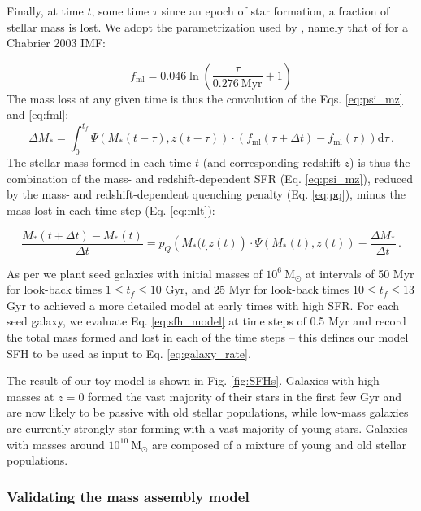 \documentclass[fleqn,usenatbib]{mnras}
\begin{document}
Finally, at time $t$, some time $\tau$ since an epoch of star formation, a fraction of stellar mass is lost. We adopt the parametrization used by , namely that of \citet{Leitner2011} for a Chabrier 2003 IMF:

\begin{equation}
    f_{\mathrm{ml}} = 0.046\ln \left(\frac{\tau}{0.276~\mathrm{Myr}}+1 \right)
    \label{eq:fml}
\end{equation}
The mass loss at any given time is thus the convolution of the Eqs. \ref{eq:psi_mz} and \ref{eq:fml}:
\begin{equation}
    \Delta M_* = \int_0^{t_f} \Psi(M_*(t-\tau),z(t-\tau))\cdot\left(f_{\mathrm{ml}}(\tau + \Delta t) - f_{\mathrm{ml}}(\tau)\right)\mathrm{d}\tau\,.
    \label{eq:mlt}
\end{equation}
The stellar mass formed in each time $t$ (and corresponding redshift $z$) is thus the combination of the mass- and redshift-dependent SFR (Eq. \ref{eq:psi_mz}), reduced by the mass- and redshift-dependent quenching penalty (Eq. \ref{eq:pq}), minus the mass lost in each time step (Eq. \ref{eq:mlt}):

\begin{equation}
    \frac{M_*(t+\Delta t) - M_*(t)}{\Delta t} = p_Q\left(M_*(t_,z(t)\right)\cdot\Psi(M_*(t),z(t)) - \frac{\Delta M_*}{\Delta t}\,.
    \label{eq:sfh_model}
\end{equation}


As per  we plant seed galaxies with initial masses of $10^6 ~\mathrm{M}_{\odot}$ at intervals of 50 Myr for look-back times $1 \leq t_f \leq 10$ Gyr, and 25 Myr for look-back times $10 \leq t_f \leq 13$ Gyr to achieved a more detailed model at early times with high SFR. For each seed galaxy, we evaluate Eq. \ref{eq:sfh_model} at time steps of 0.5 Myr and record the total mass formed and lost in each of the time steps -- this defines our model SFH to be used as input to Eq. \ref{eq:galaxy_rate}.

The result of our toy model is shown in Fig. \ref{fig:SFHs}. Galaxies with high masses at $z=0$ formed the vast majority of their stars in the first few Gyr and are now likely to be passive with old stellar populations, while low-mass galaxies are currently strongly star-forming with a vast majority of young stars. Galaxies with masses around $10^{10}~\mathrm{M}_{\odot}$ are composed of a mixture of young and old stellar populations. 
\subsubsection{Validating the mass assembly model \label{subsubsec:validate_c14}}
\end{document}
